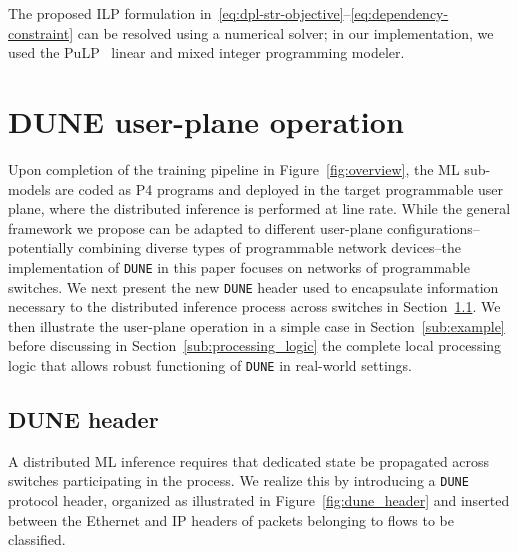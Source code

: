 \documentclass[journal]{IEEEtran}
\theoremstyle{plain} %
\newcommand{\name}{\texttt{\fontsize{9}{11}\selectfont DUNE}\xspace}
\begin{document}
The proposed ILP formulation in~\eqref{eq:dpl-str-objective}--\eqref{eq:dependency-constraint} can be resolved using a numerical solver; in our implementation, we used the PuLP~\cite{pulp} linear and mixed integer programming modeler.

\section{DUNE user-plane operation}
\label{sec:name-user-plane}

Upon completion of the training pipeline in Figure~\ref{fig:overview}, the ML sub-models are coded as P4 programs and deployed in the target programmable user plane, where the distributed inference is performed at line rate.
While the general framework we propose can be adapted to different user-plane configurations--potentially combining diverse types of programmable network devices--the implementation of \name in this paper focuses on networks of programmable switches.
We next present the new \name header used to encapsulate information necessary to the distributed inference process across switches in Section~\ref{sub:header}. We then illustrate the user-plane operation in a simple case in Section~\ref{sub:example} before discussing in Section~\ref{sub:processing_logic} the complete local processing logic that allows robust functioning of \name in real-world settings.

\subsection{DUNE header}
\label{sub:header}



A distributed ML inference requires that dedicated state be propagated across switches participating in the process. We realize this by introducing a \name protocol header, organized as illustrated in Figure~\ref{fig:dune_header} and inserted between the Ethernet and IP headers of packets belonging to flows to be classified.
\end{document}

